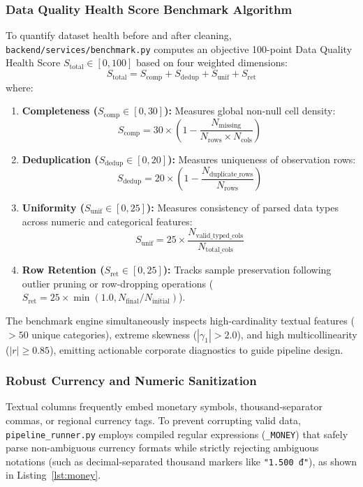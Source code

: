 \subsubsection{Data Quality Health Score Benchmark Algorithm}
To quantify dataset health before and after cleaning, \texttt{backend/services/benchmark.py} computes an objective 100-point Data Quality Health Score $S_{\text{total}} \in [0, 100]$ based on four weighted dimensions:
\begin{equation}
S_{\text{total}} = S_{\text{comp}} + S_{\text{dedup}} + S_{\text{unif}} + S_{\text{ret}}
\end{equation}
where:
\begin{enumerate}
  \item \textbf{Completeness ($S_{\text{comp}} \in [0, 30]$):} Measures global non-null cell density:
  \begin{equation}
  S_{\text{comp}} = 30 \times \left(1 - \frac{N_{\text{missing}}}{N_{\text{rows}} \times N_{\text{cols}}}\right)
  \end{equation}
  \item \textbf{Deduplication ($S_{\text{dedup}} \in [0, 20]$):} Measures uniqueness of observation rows:
  \begin{equation}
  S_{\text{dedup}} = 20 \times \left(1 - \frac{N_{\text{duplicate\_rows}}}{N_{\text{rows}}}\right)
  \end{equation}
  \item \textbf{Uniformity ($S_{\text{unif}} \in [0, 25]$):} Measures consistency of parsed data types across numeric and categorical features:
  \begin{equation}
  S_{\text{unif}} = 25 \times \frac{N_{\text{valid\_typed\_cols}}}{N_{\text{total\_cols}}}
  \end{equation}
  \item \textbf{Row Retention ($S_{\text{ret}} \in [0, 25]$):} Tracks sample preservation following outlier pruning or row-dropping operations ($S_{\text{ret}} = 25 \times \min(1.0, N_{\text{final}} / N_{\text{initial}})$).
\end{enumerate}

The benchmark engine simultaneously inspects high-cardinality textual features ($> 50$ unique categories), extreme skewness ($|\gamma_1| > 2.0$), and high multicollinearity ($|r| \ge 0.85$), emitting actionable corporate diagnostics to guide pipeline design.

\subsubsection{Robust Currency and Numeric Sanitization}
Textual columns frequently embed monetary symbols, thousand-separator commas, or regional currency tags. To prevent corrupting valid data, \texttt{pipeline\_runner.py} employs compiled regular expressions (\texttt{\_MONEY}) that safely parse non-ambiguous currency formats while strictly rejecting ambiguous notations (such as decimal-separated thousand markers like \texttt{"1.500 đ"}), as shown in Listing~\ref{lst:money}.

